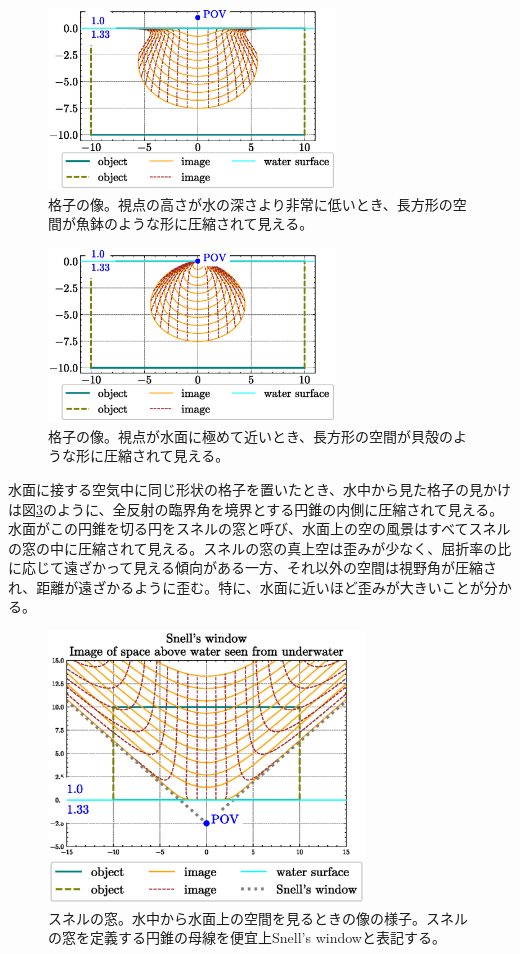 \documentclass[twocolumn]{article}
\begin{document}
\begin{figure}
	\centering
	\includegraphics[width=3in]{figs/fishjar.eps}
	\caption{格子の像。視点の高さが水の深さより非常に低いとき、長方形の空間が魚鉢のような形に圧縮されて見える。}
	\label{fig:fishbowl}
\end{figure}

\begin{figure}
	\centering
	\includegraphics[width=3in]{figs/seashell_shape.eps}
	\caption{格子の像。視点が水面に極めて近いとき、長方形の空間が貝殻のような形に圧縮されて見える。}
	\label{fig:seashell}
\end{figure}

水面に接する空気中に同じ形状の格子を置いたとき、水中から見た格子の見かけは図\ref{fig:snell_window}のように、全反射の臨界角を境界とする円錐の内側に圧縮されて見える。水面がこの円錐を切る円をスネルの窓と呼び、水面上の空の風景はすべてスネルの窓の中に圧縮されて見える。スネルの窓の真上空は歪みが少なく、屈折率の比に応じて遠ざかって見える傾向がある一方、それ以外の空間は視野角が圧縮され、距離が遠ざかるように歪む。特に、水面に近いほど歪みが大きいことが分かる。

\begin{figure}
	\centering
	\includegraphics[width=3.3in]{figs/snell_window.eps}
	\caption{スネルの窓。水中から水面上の空間を見るときの像の様子。スネルの窓を定義する円錐の母線を便宜上Snell's windowと表記する。}
	\label{fig:snell_window}
\end{figure}
\end{document}
